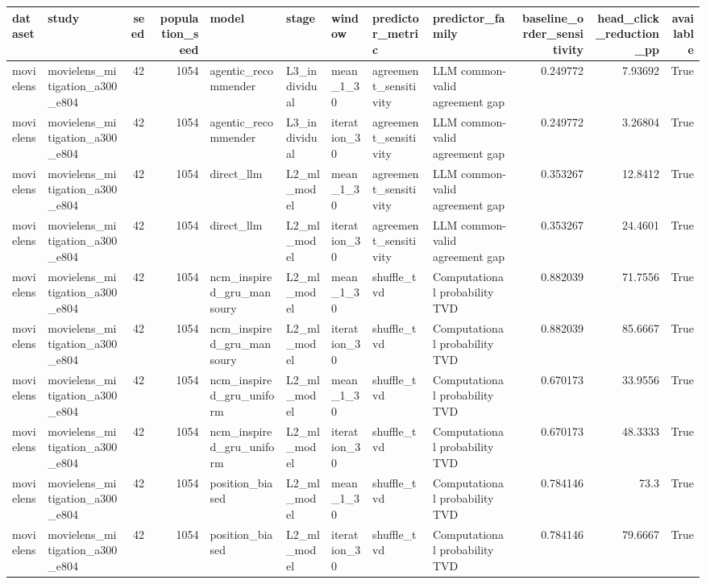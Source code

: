 \begin{table}[htbp!]
\centering
\small
\setlength{\tabcolsep}{3pt}
\renewcommand{\arraystretch}{1.1}
\begin{tabular}{llrrlllllrrr}
\hline
dataset & study & seed & population\_seed & model & stage & window & predictor\_metric & predictor\_family & baseline\_order\_sensitivity & head\_click\_reduction\_pp & available \\
\hline
movielens & movielens\_mitigation\_a300\_e804 & 42 & 1054 & agentic\_recommender & L3\_individual & mean\_1\_30 & agreement\_sensitivity & LLM common-valid agreement gap & 0.249772 & 7.93692 & True \\
movielens & movielens\_mitigation\_a300\_e804 & 42 & 1054 & agentic\_recommender & L3\_individual & iteration\_30 & agreement\_sensitivity & LLM common-valid agreement gap & 0.249772 & 3.26804 & True \\
movielens & movielens\_mitigation\_a300\_e804 & 42 & 1054 & direct\_llm & L2\_ml\_model & mean\_1\_30 & agreement\_sensitivity & LLM common-valid agreement gap & 0.353267 & 12.8412 & True \\
movielens & movielens\_mitigation\_a300\_e804 & 42 & 1054 & direct\_llm & L2\_ml\_model & iteration\_30 & agreement\_sensitivity & LLM common-valid agreement gap & 0.353267 & 24.4601 & True \\
movielens & movielens\_mitigation\_a300\_e804 & 42 & 1054 & ncm\_inspired\_gru\_mansoury & L2\_ml\_model & mean\_1\_30 & shuffle\_tvd & Computational probability TVD & 0.882039 & 71.7556 & True \\
movielens & movielens\_mitigation\_a300\_e804 & 42 & 1054 & ncm\_inspired\_gru\_mansoury & L2\_ml\_model & iteration\_30 & shuffle\_tvd & Computational probability TVD & 0.882039 & 85.6667 & True \\
movielens & movielens\_mitigation\_a300\_e804 & 42 & 1054 & ncm\_inspired\_gru\_uniform & L2\_ml\_model & mean\_1\_30 & shuffle\_tvd & Computational probability TVD & 0.670173 & 33.9556 & True \\
movielens & movielens\_mitigation\_a300\_e804 & 42 & 1054 & ncm\_inspired\_gru\_uniform & L2\_ml\_model & iteration\_30 & shuffle\_tvd & Computational probability TVD & 0.670173 & 48.3333 & True \\
movielens & movielens\_mitigation\_a300\_e804 & 42 & 1054 & position\_biased & L2\_ml\_model & mean\_1\_30 & shuffle\_tvd & Computational probability TVD & 0.784146 & 73.3 & True \\
movielens & movielens\_mitigation\_a300\_e804 & 42 & 1054 & position\_biased & L2\_ml\_model & iteration\_30 & shuffle\_tvd & Computational probability TVD & 0.784146 & 79.6667 & True \\

\end{tabular}
\end{table}
